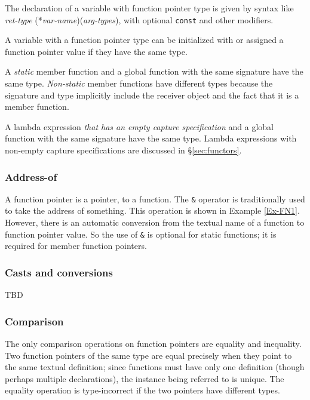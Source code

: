 The declaration of a variable with function pointer type is given by syntax like\\
\emph{ret-type} (*\emph{var-name})(\emph{arg-types}), with optional \lstinline|const| and other modifiers.

A variable with a function pointer type can be initialized with or assigned a function pointer value if they have the same type.

A \emph{static} member function and
a global function with the same signature have the same type.
\emph{Non-static} member functions have different types because
the signature and type implicitly include the receiver object
and the fact that it is a member function.

A lambda expression \emph{that has an empty capture specification} and
a global function with the same signature have the same type.
Lambda expressions with non-empty capture specifications are discussed 
in \S\ref{sec:functors}.

\subsubsection{Address-of}

A function pointer is a pointer, to a function. 
The \lstinline|&| operator is traditionally used to take
the address of something. 
This operation is shown in Example \ref{Ex-FN1}.
However, there is an automatic conversion from the textual
name of a function to function pointer value. 
So the use of \lstinline|&| is optional for static functions; it is required for member function pointers.

\subsubsection{Casts and conversions}

TBD

\subsubsection{Comparison}

The only comparison operations on function pointers are 
equality and inequality. Two function pointers of the 
same type are equal precisely when they point to the same
textual definition; since functions must have only one
definition (though perhaps multiple declarations), 
the instance being referred to is unique. 
The equality operation is type-incorrect if the two
pointers have different types.

